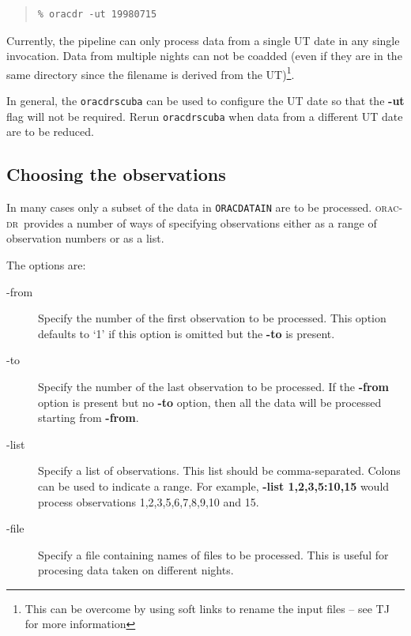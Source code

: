 \documentclass[twoside,11pt]{article}
\newcommand{\xref}[3]{#1}
\newcommand{\xlabel}[1]{}
\renewcommand{\_}{\texttt{\symbol{95}}}
\newcommand{\oracdr}{\xref{\textsc{orac-dr}}{sun230}{}}
\newenvironment{myquote}{\begin{quote}\begin{small}}{\end{small}\end{quote}}
\begin{document}
\begin{myquote}
\begin{verbatim}
% oracdr -ut 19980715
\end{verbatim}
\end{myquote}

Currently, the pipeline can only process data from a single UT date in any
single invocation.  Data from multiple nights can not be coadded (even if they
are in the same directory since the filename is derived from the
UT)\footnote{This can be overcome by using soft links to rename the input files
-- see TJ for more information}.

In general, the \texttt{oracdr\_scuba} can be used to configure the
UT date so that the \textbf{-ut} flag will not be required.
Rerun \texttt{oracdr\_scuba} when data from a different UT date are to
be reduced.

\subsection{Choosing the observations\xlabel{choosing_the_observations}}

In many cases only a subset of the data in \texttt{ORAC\_DATA\_IN} are to be
processed. \oracdr\ provides a number of ways of specifying observations
either as a range of observation numbers or as a list.

The options are:

\begin{description}
\item[-from] \mbox{}

Specify the number of the first observation to be processed. 
This option defaults to `1' if this option is omitted but the \textbf{-to} is
present.

\item[-to] \mbox{}

Specify the number of the last observation to be processed. If
the \textbf{-from} option is present but no \textbf{-to} option, then
all the data will be processed starting from \textbf{-from}.

\item[-list] \mbox{}

Specify a list of observations. This list should be comma-separated. Colons
can be used to indicate a range. For example, \textbf{-list 1,2,3,5:10,15}
would process observations 1,2,3,5,6,7,8,9,10 and 15.

\item[-file] \mbox{}

Specify a file containing names of files to be processed. This is useful
for procesing data taken on different nights.

\end{description}
\end{document}
